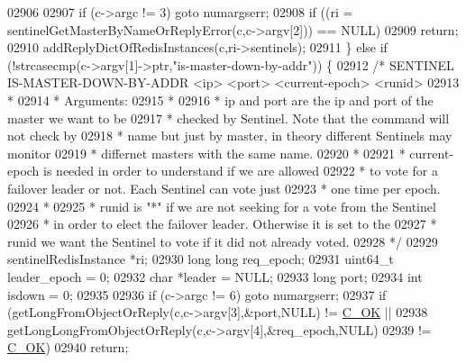 \begin{DoxyCode}
{{{{{{{{{{{{{{{{{{{{{{{{{{{{{{{{{{{{{{{{{{{{{{{{{{{{{{{{{02906 
02907         \textcolor{keywordflow}{if} (c->argc != 3) \textcolor{keywordflow}{goto} numargserr;
02908         \textcolor{keywordflow}{if} ((ri = sentinelGetMasterByNameOrReplyError(c,c->argv[2])) == NULL)
02909             \textcolor{keywordflow}{return};
02910         addReplyDictOfRedisInstances(c,ri->sentinels);
02911     \} \textcolor{keywordflow}{else} \textcolor{keywordflow}{if} (!strcasecmp(c->argv[1]->ptr,\textcolor{stringliteral}{"is-master-down-by-addr"})) \{
02912         \textcolor{comment}{/* SENTINEL IS-MASTER-DOWN-BY-ADDR <ip> <port> <current-epoch> <runid>}
02913 \textcolor{comment}{         *}
02914 \textcolor{comment}{         * Arguments:}
02915 \textcolor{comment}{         *}
02916 \textcolor{comment}{         * ip and port are the ip and port of the master we want to be}
02917 \textcolor{comment}{         * checked by Sentinel. Note that the command will not check by}
02918 \textcolor{comment}{         * name but just by master, in theory different Sentinels may monitor}
02919 \textcolor{comment}{         * differnet masters with the same name.}
02920 \textcolor{comment}{         *}
02921 \textcolor{comment}{         * current-epoch is needed in order to understand if we are allowed}
02922 \textcolor{comment}{         * to vote for a failover leader or not. Each Sentinel can vote just}
02923 \textcolor{comment}{         * one time per epoch.}
02924 \textcolor{comment}{         *}
02925 \textcolor{comment}{         * runid is "*" if we are not seeking for a vote from the Sentinel}
02926 \textcolor{comment}{         * in order to elect the failover leader. Otherwise it is set to the}
02927 \textcolor{comment}{         * runid we want the Sentinel to vote if it did not already voted.}
02928 \textcolor{comment}{         */}
02929         sentinelRedisInstance *ri;
02930         \textcolor{keywordtype}{long} \textcolor{keywordtype}{long} req\_epoch;
02931         uint64\_t leader\_epoch = 0;
02932         \textcolor{keywordtype}{char} *leader = NULL;
02933         \textcolor{keywordtype}{long} port;
02934         \textcolor{keywordtype}{int} isdown = 0;
02935 
02936         \textcolor{keywordflow}{if} (c->argc != 6) \textcolor{keywordflow}{goto} numargserr;
02937         \textcolor{keywordflow}{if} (getLongFromObjectOrReply(c,c->argv[3],&port,NULL) != \hyperlink{server_8h_a303769ef1065076e68731584e758d3e1}{C\_OK} ||
02938             getLongLongFromObjectOrReply(c,c->argv[4],&req\_epoch,NULL)
02939                                                               != \hyperlink{server_8h_a303769ef1065076e68731584e758d3e1}{C\_OK})
02940             \textcolor{keywordflow}{return};
}}}}}}}}}}}}}}}}}}}}}}}}}}}}}}}}}}}}}}}}}}}}}}}}}}}}}}}}}
\end{DoxyCode}
